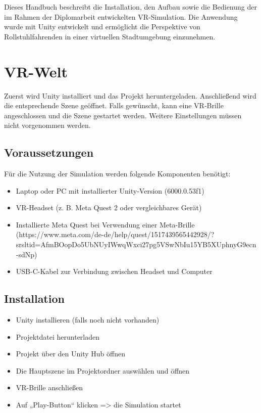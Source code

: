 
Dieses Handbuch beschreibt die Installation, den Aufbau sowie die Bedienung der im Rahmen der Diplomarbeit 
entwickelten VR-Simulation. Die Anwendung wurde mit Unity entwickelt und ermöglicht die 
Perspektive von Rollstuhlfahrenden in einer virtuellen Stadtumgebung einzunehmen.

\section{VR-Welt}
Zuerst wird Unity installiert und das Projekt heruntergeladen. Anschließend wird die entsprechende Szene geöffnet. Falls gewünscht, kann eine VR-Brille angeschlossen und die Szene gestartet werden. Weitere Einstellungen müssen nicht vorgenommen werden.

\subsection{Voraussetzungen}
Für die Nutzung der Simulation werden folgende Komponenten benötigt:
\begin{itemize}
    \item Laptop oder PC mit installierter Unity-Version (6000.0.53f1)
    \item VR-Headset (z. B. Meta Quest 2 oder vergleichbares Gerät)
    \item Installierte Meta Quest bei Verwendung einer Meta-Brille 
    (https://www.meta.com/de-de/help/quest/1517439565442928/?srsltid=AfmBOopDo5UbNUyIWwqWxci27pg5VSwNbIu15YB5XUphnyG9ecn-sdNp)
    \item USB-C-Kabel zur Verbindung zwischen Headset und Computer
\end{itemize}

\subsection{Installation}
\begin{itemize}
    \item Unity installieren (falls noch nicht vorhanden)
    \item Projektdatei herunterladen
    \item Projekt über den Unity Hub öffnen
    \item Die Hauptszene im Projektordner auswählen und öffnen
    \item VR-Brille anschließen
    \item Auf „Play-Button“ klicken => die Simulation startet
\end{itemize}


